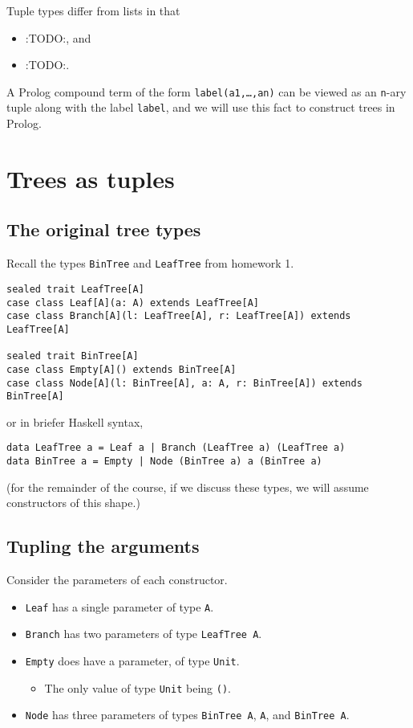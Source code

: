 \documentclass[11pt]{article}
\begin{document}
Tuple types differ from lists in that
\begin{itemize}
\item :TODO:, and
\item :TODO:.
\end{itemize}

A Prolog compound term of the form \texttt{label(a1,…,an)} can be viewed
as an \texttt{n}-ary tuple along with the label \texttt{label},
and we will use this fact to construct trees in Prolog.

\section{Trees as tuples}
\label{sec:orgbbb6d47}

\subsection{The original tree types}
\label{sec:org4315fd3}

Recall the types \texttt{BinTree} and \texttt{LeafTree} from homework 1.
\begin{verbatim}
sealed trait LeafTree[A]
case class Leaf[A](a: A) extends LeafTree[A]
case class Branch[A](l: LeafTree[A], r: LeafTree[A]) extends LeafTree[A]

sealed trait BinTree[A]
case class Empty[A]() extends BinTree[A]
case class Node[A](l: BinTree[A], a: A, r: BinTree[A]) extends BinTree[A]
\end{verbatim}
or in briefer Haskell syntax,
\begin{verbatim}
data LeafTree a = Leaf a | Branch (LeafTree a) (LeafTree a)
data BinTree a = Empty | Node (BinTree a) a (BinTree a)
\end{verbatim}
(for the remainder of the course, if we discuss these types,
we will assume constructors of this shape.)

\subsection{Tupling the arguments}
\label{sec:org58f8036}

Consider the parameters of each constructor.
\begin{itemize}
\item \texttt{Leaf} has a single parameter of type \texttt{A}.
\item \texttt{Branch} has two parameters of type \texttt{LeafTree A}.
\item \texttt{Empty} does have a parameter, of type \texttt{Unit}.
\begin{itemize}
\item The only value of type \texttt{Unit} being \texttt{()}.
\end{itemize}
\item \texttt{Node} has three parameters of types \texttt{BinTree A}, \texttt{A}, and \texttt{BinTree A}.
\end{itemize}
\end{document}
